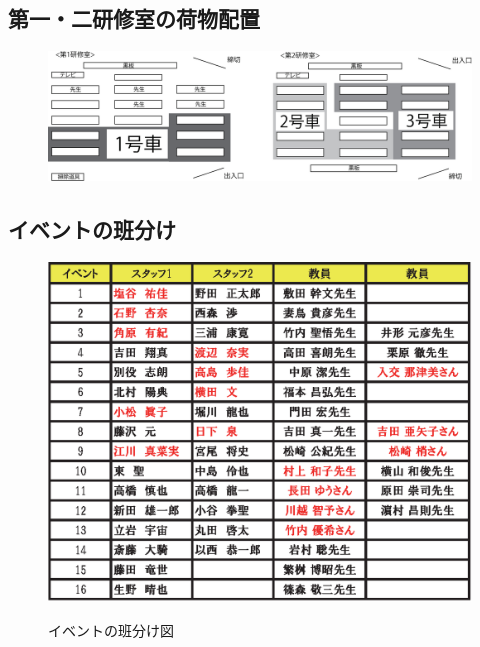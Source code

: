 \subsection{第一・二研修室の荷物配置}
\begin{figure}[H]
\begin{center}
\includegraphics[scale=0.4]{./19/busnimotsu.eps}
\end{center}
\end{figure}

\vspace{-3mm}
\subsection{イベントの班分け}
\begin{figure}[H]
\begin{center}
\includegraphics[scale=0.8]{./19/event_hanwake.eps}
\label{fig:Eventhanwake}
\caption{イベントの班分け図}
\end{center}
\end{figure}



%
